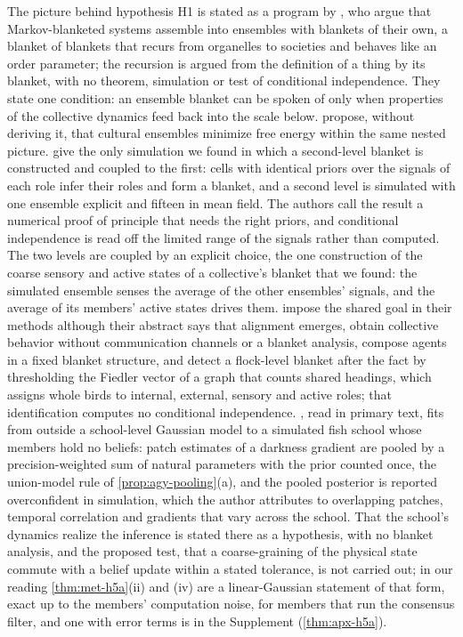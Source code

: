 The picture behind hypothesis H1 is stated as a program by \citet{kirchhoff2018markov}, who argue that Markov-blanketed systems assemble into ensembles with blankets of their own, a blanket of blankets that recurs from organelles to societies and behaves like an order parameter; the recursion is argued from the definition of a thing by its blanket, with no theorem, simulation or test of conditional independence. They state one condition: an ensemble blanket can be spoken of only when properties of the collective dynamics feed back into the scale below. \citet{ramstead2018answering} propose, without deriving it, that cultural ensembles minimize free energy within the same nested picture. \citet{palacios2020markov} give the only simulation we found in which a second-level blanket is constructed and coupled to the first: cells with identical priors over the signals of each role infer their roles and form a blanket, and a second level is simulated with one ensemble explicit and fifteen in mean field. The authors call the result a numerical proof of principle that needs the right priors, and conditional independence is read off the limited range of the signals rather than computed. The two levels are coupled by an explicit choice, the one construction of the coarse sensory and active states of a collective's blanket that we found: the simulated ensemble senses the average of the other ensembles' signals, and the average of its members' active states drives them. \citet{kaufmann2021active} impose the shared goal in their methods although their abstract says that alignment emerges, \citet{heins2023spin,heins2024collective} obtain collective behavior without communication channels or a blanket analysis, \citet{waade2025one} compose agents in a fixed blanket structure, and \citet{maisto2025flock} detect a flock-level blanket after the fact by thresholding the Fiedler vector of a graph that counts shared headings, which assigns whole birds to internal, external, sensory and active roles; that identification computes no conditional independence. \citet{heins2026collective}, read in primary text, fits from outside a school-level Gaussian model to a simulated fish school whose members hold no beliefs: patch estimates of a darkness gradient are pooled by a precision-weighted sum of natural parameters with the prior counted once, the union-model rule of \cref{prop:agy-pooling}(a), and the pooled posterior is reported overconfident in simulation, which the author attributes to overlapping patches, temporal correlation and gradients that vary across the school. That the school's dynamics realize the inference is stated there as a hypothesis, with no blanket analysis, and the proposed test, that a coarse-graining of the physical state commute with a belief update within a stated tolerance, is not carried out; in our reading \cref{thm:met-h5a}(ii) and (iv) are a linear-Gaussian statement of that form, exact up to the members' computation noise, for members that run the consensus filter, and one with error terms is in the Supplement (\cref{thm:apx-h5a}).

